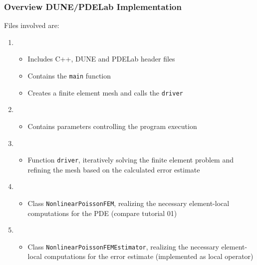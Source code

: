 \documentclass[aspectratio=169,11pt]{beamer}
\theoremstyle{definition}
\begin{document}
\begin{frame}
\frametitle{Overview DUNE/PDELab Implementation}
Files involved are:
\begin{enumerate}[1)]
\item {}
\begin{itemize}
\item Includes C++, DUNE and PDELab header files 
\item Contains the \lstinline{main} function
\item Creates a finite element mesh and calls the \lstinline{driver}
\end{itemize}
\item {}
\begin{itemize}
\item Contains parameters controlling the program execution
\end{itemize}
\item {}
\begin{itemize}
\item Function \lstinline{driver}, iteratively solving the finite element problem
  and refining the mesh based on the calculated error estimate
\end{itemize}
\item {}
\begin{itemize}
\item Class \lstinline{NonlinearPoissonFEM},
  realizing the necessary element-local computations for the PDE (compare tutorial 01)
\end{itemize}
\item {}
\begin{itemize}
\item Class \lstinline{NonlinearPoissonFEMEstimator},
  realizing the necessary element-local computations for the error estimate (implemented as local operator)
\end{itemize}
\end{enumerate}
\end{frame}
\end{document}
